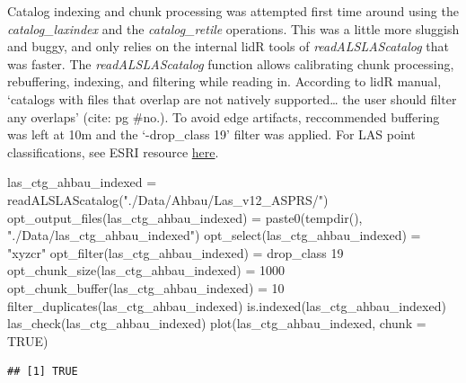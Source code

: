 \documentclass[
]{article}
\newenvironment{Shaded}{\begin{snugshade}}{\end{snugshade}}
\newcommand{\AttributeTok}[1]{\textcolor[rgb]{0.77,0.63,0.00}{#1}}
\newcommand{\ConstantTok}[1]{\textcolor[rgb]{0.00,0.00,0.00}{#1}}
\newcommand{\DecValTok}[1]{\textcolor[rgb]{0.00,0.00,0.81}{#1}}
\newcommand{\FunctionTok}[1]{\textcolor[rgb]{0.00,0.00,0.00}{#1}}
\newcommand{\NormalTok}[1]{#1}
\newcommand{\OtherTok}[1]{\textcolor[rgb]{0.56,0.35,0.01}{#1}}
\newcommand{\StringTok}[1]{\textcolor[rgb]{0.31,0.60,0.02}{#1}}
\begin{document}
Catalog indexing and chunk processing was attempted first time around
using the \emph{catalog\_laxindex} and the \emph{catalog\_retile}
operations. This was a little more sluggish and buggy, and only relies
on the internal lidR tools of \emph{readALSLAScatalog} that was faster.
The \emph{readALSLAScatalog} function allows calibrating chunk
processing, rebuffering, indexing, and filtering while reading in.
According to lidR manual, `catalogs with files that overlap are not
natively supported\ldots{} the user should filter any overlaps' (cite:
pg \#no.). To avoid edge artifacts, reccommended buffering was left at
10m and the `-drop\_class 19' filter was applied. For LAS point
classifications, see ESRI resource
\href{https://desktop.arcgis.com/en/arcmap/latest/manage-data/las-dataset/lidar-point-classification.htm\#ESRI_SECTION1_FDEB62EB5C2B463F86507C3EE0A7F441}{here}.

\begin{Shaded}
\begin{Highlighting}[]
\NormalTok{las\_ctg\_ahbau\_indexed }\OtherTok{=} \FunctionTok{readALSLAScatalog}\NormalTok{(}\StringTok{"./Data/Ahbau/Las\_v12\_ASPRS/"}\NormalTok{)}
\FunctionTok{opt\_output\_files}\NormalTok{(las\_ctg\_ahbau\_indexed) }\OtherTok{=} \FunctionTok{paste0}\NormalTok{(}\FunctionTok{tempdir}\NormalTok{(), }\StringTok{"./Data/las\_ctg\_ahbau\_indexed"}\NormalTok{)}
\FunctionTok{opt\_select}\NormalTok{(las\_ctg\_ahbau\_indexed) }\OtherTok{=} \StringTok{"xyzcr"}
\FunctionTok{opt\_filter}\NormalTok{(las\_ctg\_ahbau\_indexed) }\OtherTok{=} \StringTok{\textquotesingle{}{-}drop\_class 19\textquotesingle{}} 
\FunctionTok{opt\_chunk\_size}\NormalTok{(las\_ctg\_ahbau\_indexed) }\OtherTok{=} \DecValTok{1000} 
\FunctionTok{opt\_chunk\_buffer}\NormalTok{(las\_ctg\_ahbau\_indexed) }\OtherTok{=} \DecValTok{10}
\FunctionTok{filter\_duplicates}\NormalTok{(las\_ctg\_ahbau\_indexed)}
\FunctionTok{is.indexed}\NormalTok{(las\_ctg\_ahbau\_indexed)}
\FunctionTok{las\_check}\NormalTok{(las\_ctg\_ahbau\_indexed)}
\FunctionTok{plot}\NormalTok{(las\_ctg\_ahbau\_indexed, }\AttributeTok{chunk =} \ConstantTok{TRUE}\NormalTok{)}
\end{Highlighting}
\end{Shaded}

\begin{verbatim}
## [1] TRUE
\end{verbatim}
\end{document}
